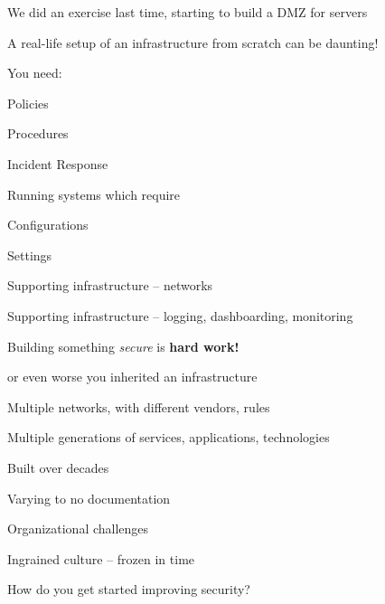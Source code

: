 \documentclass[Screen16to9,17pt]{foils}
\begin{document}

\begin{list1}
\item We did an exercise last time, starting to build a DMZ for servers
\item A real-life setup of an infrastructure from scratch can be daunting!
\item You need:
\begin{list2}
\item Policies
\item Procedures
\item Incident Response
\end{list2}
\item Running systems which require
\begin{list2}
\item Configurations
\item Settings
\item Supporting infrastructure -- networks
\item Supporting infrastructure -- logging, dashboarding, monitoring
\end{list2}
\item Building something \emph{secure} is {\bf hard work!}
\end{list1}




\begin{list1}
\item or even worse you inherited an infrastructure
\item Multiple networks, with different vendors, rules
\item Multiple generations of services, applications, technologies
\item Built over decades
\item Varying to no documentation
\item Organizational challenges
\item Ingrained culture -- frozen in time
\end{list1}

How do you get started improving security?


\end{document}
